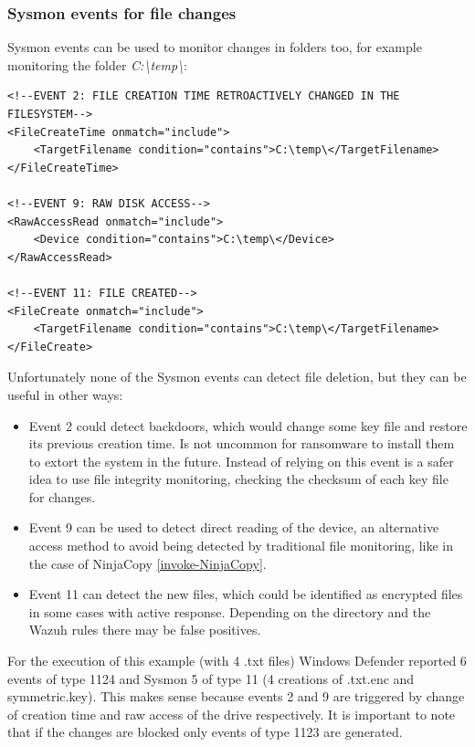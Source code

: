\subsubsection{Sysmon events for file changes}
Sysmon events can be used to monitor changes in folders too, for example monitoring the folder \textit{C:{\textbackslash}temp{\textbackslash}}:
\begin{lstlisting}[style=xml]
<!--EVENT 2: FILE CREATION TIME RETROACTIVELY CHANGED IN THE FILESYSTEM-->
<FileCreateTime onmatch="include">
	<TargetFilename condition="contains">C:\temp\</TargetFilename>
</FileCreateTime>

<!--EVENT 9: RAW DISK ACCESS-->
<RawAccessRead onmatch="include">
	<Device condition="contains">C:\temp\</Device>
</RawAccessRead>

<!--EVENT 11: FILE CREATED-->
<FileCreate onmatch="include">
	<TargetFilename condition="contains">C:\temp\</TargetFilename>
</FileCreate>
\end{lstlisting}
\linej
Unfortunately none of the Sysmon events can detect file deletion, but they can be useful in other ways:
\begin{itemize}
	\item Event 2 could detect backdoors, which would change some key file and restore its previous creation time. Is not uncommon for ransomware to install them to extort the system in the future. Instead of relying on this event is a safer idea to use file integrity monitoring, checking the checksum of each key file for changes.
	\item Event 9 can be used to detect direct reading of the device, an alternative access method to avoid being detected by traditional file monitoring, like in the case of NinjaCopy \ref{invoke-NinjaCopy}.
	\item Event 11 can detect the new files, which could be identified as encrypted files in some cases with active response. Depending on the directory and the Wazuh rules there may be false positives.
\end{itemize}
\linej
For the execution of this example (with 4 .txt files) Windows Defender reported 6 events of type 1124 and Sysmon 5 of type 11 (4 creations of .txt.enc and symmetric.key).
This makes sense because events 2 and 9 are triggered by change of creation time and raw access of the drive respectively.
It is important to note that if the changes are blocked only events of type 1123 are generated.

